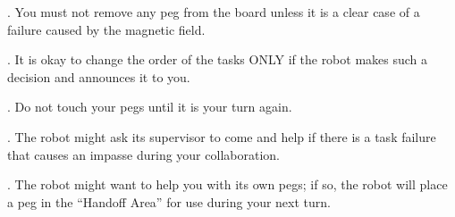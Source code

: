 \documentclass[12pt]{report}
\begin{document}
\begin{appendices}
. You must not remove any peg from the board unless it is a clear case
of a failure caused by the magnetic field.

. It is okay to change the order of the tasks ONLY if the robot makes
such a decision and announces it to you.

. Do not touch your pegs until it is your turn again.

. The robot might ask its supervisor to come and help if there is a
task failure that causes an impasse during your collaboration.

. The robot might want to help you with its own pegs; if so, the robot
will place a peg in the “Handoff Area” for use during your next turn.

\end{appendices}
\end{document}
